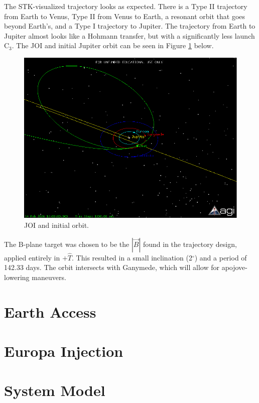 \documentclass[]{aiaa-tc}%
\begin{document}
The STK-visualized trajectory looks as expected. There is a Type II trajectory from Earth to Venus, Type II from Venus to Earth, a resonant orbit that goes beyond Earth's, and a Type I trajectory to Jupiter. The trajectory from Earth to Jupiter almost looks like a Hohmann transfer, but with a significantly less launch C$_3$. The JOI and initial Jupiter orbit can be seen in Figure \ref{fig:JOI} below.

	\begin{figure}[H]
		\centering
			\includegraphics[width = 18cm]{../Figures/JOI_Initial_orb.png}
		\caption{JOI and initial orbit. }
		\label{fig:JOI}
	\end{figure}	

The B-plane target was chosen to be the $\left |{\vec{B}}  \right |$ found in the trajectory design, applied entirely in $+\hat{T}$. This resulted in a small inclination (2$^\circ$) and a period of 142.33 days. The orbit intersects with Ganymede, which will allow for apojove-lowering maneuvers.

	\section{Earth Access}

	\section{Europa Injection}

	\section{System Model}
\end{document}
